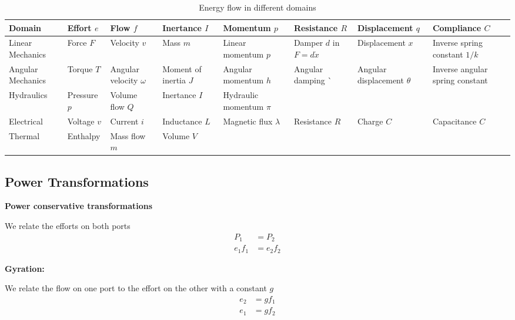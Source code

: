 \begin{table}[h]
    \centering
    \tiny
    \begin{tabular}{|m{5em}|m{5em}|m{5em}|m{5em}|m{6em}|m{5em}|m{6em}|m{6em}|}
        \hline
        \textbf{Domain} & \textbf{Effort} $e$ &	\textbf{Flow} $f$ &	\textbf{Inertance} $I$ & \textbf{Momentum} $p$	& \textbf{Resistance} $R$	& \textbf{Displacement} $q$	& \textbf{Compliance} $C$ 
        \\\hline
        Linear Mechanics	& Force $F$	& Velocity $v$	& Mass $m$	& Linear momentum $p$	& Damper $d$ in $F=d\dot{x}$	& Displacement $x$	& Inverse spring constant $1/k$ 
        \\\hline
        Angular Mechanics	& Torque $T$	& Angular velocity $\omega$	& Moment of inertia $J$	& Angular momentum $h$	& Angular damping ^^	& Angular displacement $\theta$	& Inverse angular spring constant 
        \\\hline
        Hydraulics	& Pressure $p$	& Volume flow $Q$	& Inertance $I$	& Hydraulic momentum $\pi$	& 	& 	&  
        \\\hline
        Electrical	& Voltage $v$	& Current $i$	& Inductance $L$	& Magnetic flux $\lambda$	& Resistance $R$	& Charge $C$	& Capacitance $C$ 
        \\\hline
        Thermal	& Enthalpy 	& Mass flow $m$ 	& Volume $V$ & & & &
        \\\hline
    \end{tabular}
    \caption{Energy flow in different domains}
    \label{tab:energyDomain}
\end{table}



\subsection{Power Transformations}
\textbf{Power conservative transformations}

We relate the efforts on both ports
\begin{equation}
    \begin{split}
        P_1&=P_2\\
        e_1f_1&=e_2f_2
    \end{split} 
\end{equation}

\textbf{Gyration:}

We relate the flow on one port to the effort on the other with a constant $g$
\begin{equation}
    \begin{split}
        e_2&=gf_1\\
        e_1&=gf_2
    \end{split}
\end{equation}

